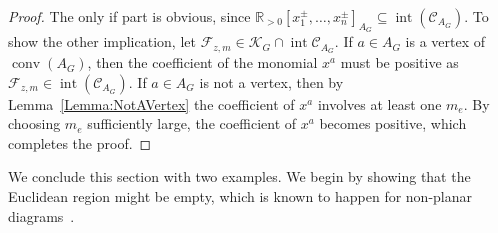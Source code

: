 \documentclass[a4paper,11pt]{amsart}
\theoremstyle{definition}
\DeclareMathOperator{\interior}{int}
\DeclareMathOperator{\conv}{conv}
\begin{document}
\begin{proof}
The only if part is obvious, since $\mathbb{R}_{>0}[x_1^\pm, \dots,x_n^\pm]_{A_G} \subseteq \interior(\mathcal{C}_{A_G})$.
To show the other implication, let $\mathcal{F}_{z,m} \in \mathcal{K}_G \cap \interior \mathcal{C}_{A_G}$.
If $a \in A_G$ is a vertex of $\conv(A_G)$, then the coefficient of the monomial $x^a$ must be positive as $\mathcal{F}_{z,m} \in \interior (\mathcal{C}_{A_G})$.
If $a \in A_G$ is not a vertex, then by Lemma~\ref{Lemma:NotAVertex} the coefficient of $x^a$ involves at least one $m_e$. By choosing $m_e$ sufficiently large, the coefficient of $x^a$ becomes positive, which completes the proof.
\end{proof}

We conclude this section with two examples. We begin by showing that the Euclidean region might be empty, which is known to happen for non-planar diagrams~\cite{HennSmirnovSmirnov,HennRaman}.
\end{document}
